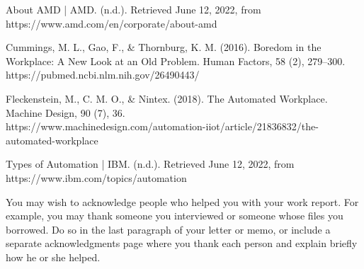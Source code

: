 \documentclass[12pt]{article}
\begin{document}



About AMD | AMD. (n.d.). Retrieved June 12, 2022, from \\
https://www.amd.com/en/corporate/about-amd 

Cummings, M. L., Gao, F., \& Thornburg, K. M. (2016). Boredom in the Workplace: A New Look at an Old Problem. Human Factors, 58 (2), 279–300. \\
https://pubmed.ncbi.nlm.nih.gov/26490443/

Fleckenstein, M., C. M. O., \& Nintex. (2018). The Automated Workplace. Machine Design, 90 (7), 36. \\
https://www.machinedesign.com/automation-iiot/article/21836832/the-automated-workplace

Types of Automation | IBM. (n.d.). Retrieved June 12, 2022, from \\
https://www.ibm.com/topics/automation
	






You may wish to acknowledge people who helped you with your work report. For example, you may thank someone you interviewed or someone whose files you borrowed. Do so in the last paragraph of your letter or memo, or include a separate acknowledgments page where you thank each person and explain briefly how he or she helped.
\end{document}
